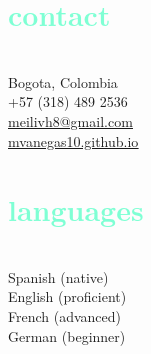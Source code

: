 \documentclass[english]{cv-style}          %
\begin{document}
\lastupdated

\begin{aside}
%
\vspace{2.5cm}
\section{\textcolor{aquamarine}{contact}}\\
\vspace{0.2cm}
Bogota, Colombia\\
\vspace{0.1cm}
+57 (318) 489 2536\\
\vspace{0.1cm}
{\href{mailto:meilivh8@gmail.com}{\underline{meilivh8@gmail.com}}}\\
\vspace{0.1cm}
{\href{https://mvanegas10.github.io}{\underline{mvanegas10.github.io}}}\\
%
\vspace{2.5cm}
\section{\textcolor{aquamarine}{languages}}\\
\vspace{0.2cm}
Spanish (native)\\
\vspace{0.1cm}
English (proficient)\\
\vspace{0.1cm}
French (advanced)\\
\vspace{0.1cm}
German (beginner)\\
%
\vspace{2.5cm}

\end{aside}
\end{document}
